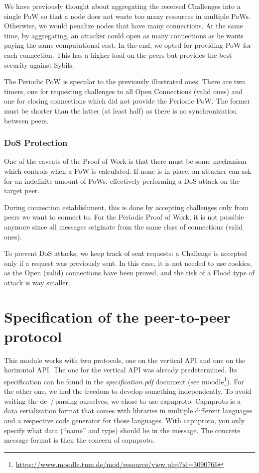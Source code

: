 \documentclass[a4paper,english,10pt,NET]{tumarticle}
\begin{document}
We have previously thought about aggregating the received Challenges into a single PoW so that a node does not waste too many resources in multiple PoWs. Otherwise, we would penalize nodes that have many connections. At the same time, by aggregating, an attacker could open as many connections as he wants paying the same computational cost. In the end, we opted for providing PoW for each connection. This has a higher load on the peers but provides the best security against Sybils.

The Periodic PoW is specular to the previously illustrated ones. There are two timers, one for requesting challenges to all Open Connections (valid ones) and one for closing connections which did not provide the Periodic PoW. The former must be shorter than the latter (at least half) as there is no synchronization between peers.  

\subsubsection{DoS Protection}

One of the caveats of the Proof of Work is that there must be some mechanism which controls when a PoW is calculated. If none is in place, an attacker can ask for an indefinite amount of PoWs, effectively performing a DoS attack on the target peer. 

During connection establishment, this is done by accepting challenges only from peers we want to connect to. For the Periodic Proof of Work, it is not possible anymore since all messages originate from the same class of connections (valid ones).

To prevent DoS attacks, we keep track of sent requests: a Challenge is accepted only if a request was previously sent. In this case, it is not needed to use cookies, as the Open (valid) connections have been proved, and the risk of a Flood type of attack is way smaller.

\section{Specification of the peer-to-peer protocol} \label{sec:msgtypes}

This module works with two protocols, one on the vertical API and one on the horizontal API.
The one for the vertical API was already predetermined.
Its specification can be found in the \emph{specification.pdf} document (see moodle\footnote{\url{https://www.moodle.tum.de/mod/resource/view.php?id=3090766}}).
For the other one, we had the freedom to develop something independently.
To avoid writing the de-\,/\,parsing ourselves, we chose to use capnproto.
Capnproto is a data serialization format that comes with libraries in multiple different languages and a respective code generator for those languages.
With capnproto, you only specify what data (\enquote{name} and type) should be in the message.
The concrete message format is then the concern of capnproto.
\end{document}
